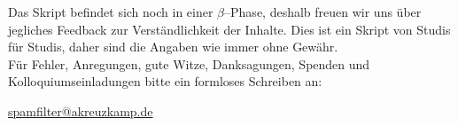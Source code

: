 \documentclass[a4paper,10pt,listof=totocnumbered,headsepline,twoside,abstracton, titlepage=false]{scrreprt}
\begin{document}
Das Skript befindet sich noch in einer $\beta$--Phase, deshalb freuen wir uns über jegliches Feedback zur Verständlichkeit der Inhalte. Dies ist ein Skript von Studis für Studis, daher sind die Angaben wie immer ohne Gewähr. \\

Für Fehler, Anregungen, gute Witze, Danksagungen, Spenden und Kolloquiumseinladungen bitte ein formloses Schreiben an: 

\href{spamfilter@akreuzkamp.de}{spamfilter@akreuzkamp.de}

\tableofcontents
























\end{document}
